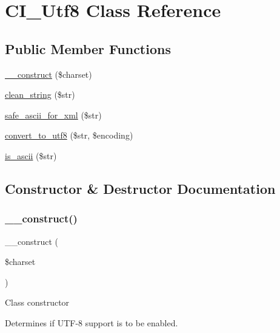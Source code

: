 \hypertarget{class_c_i___utf8}{}\section{C\+I\+\_\+\+Utf8 Class Reference}
\label{class_c_i___utf8}
\subsection*{Public Member Functions}
\begin{DoxyCompactItemize}
\item 
\mbox{\hyperlink{class_c_i___utf8_aeee5dda3eeba2574642a18f281a4832c}{\+\_\+\+\_\+construct}} (\$charset)
\item 
\mbox{\hyperlink{class_c_i___utf8_af9fc6214803042dd0b46d6ac5bdb4b7b}{clean\+\_\+string}} (\$str)
\item 
\mbox{\hyperlink{class_c_i___utf8_a10d712b507a87fd841f134143eaedb8e}{safe\+\_\+ascii\+\_\+for\+\_\+xml}} (\$str)
\item 
\mbox{\hyperlink{class_c_i___utf8_a7f6a8b9f00d7d11b23abcadfc91e9583}{convert\+\_\+to\+\_\+utf8}} (\$str, \$encoding)
\item 
\mbox{\hyperlink{class_c_i___utf8_a8676dd1e98c759c6ef90fe6a9ba4e119}{is\+\_\+ascii}} (\$str)
\end{DoxyCompactItemize}


\subsection{Constructor \& Destructor Documentation}
\mbox{\label{class_c_i___utf8_aeee5dda3eeba2574642a18f281a4832c}} 
\subsubsection{\texorpdfstring{\+\_\+\+\_\+construct()}{\_\_construct()}}
{\footnotesize\ttfamily \+\_\+\+\_\+construct (\begin{DoxyParamCaption}\item[{}]{\$charset }\end{DoxyParamCaption})}

Class constructor

Determines if U\+T\+F-\/8 support is to be enabled.

